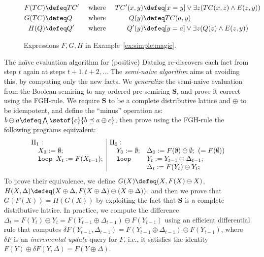 \begin{figure}
\footnotesize
  \begin{alignat*}{3}
    F(TC) \defeq & TC' &&\mbox{ where } & TC'(x,y) \defeq &[x=y] \vee \exists z(TC(x,z) \wedge E(z,y)) \\
    G(TC) \defeq & Q   &&\mbox{ where } & Q(y) \defeq & TC(a,y) \\
    H(Q) \defeq & Q'   &&\mbox{ where } & Q'(y) \defeq & [y=a] \vee \exists z(Q(z) \wedge E(z,y))
  \end{alignat*}
\caption{Expressions $F,G,H$ in Example~\ref{ex:simple:magic}.}
  \label{fig:simple:magic}
\end{figure}

\begin{ex} The na\"ive evaluation
    algorithm for (positive) Datalog re-discovers each fact from step $t$ again at
    steps $t+1, t+2, \ldots$ The {\em semi-naive algorithm} aims at avoiding
  this, by computing only the new facts.  We {\em generalize} the semi-naive
  evaluation from the Boolean semiring to any ordered pre-semiring
  $\bm S$, and prove it correct using the FGH-rule.  We require
  $\bm S$ to be a complete distributive lattice and $\oplus$ to be
  idempotent, and define the ``minus'' operation as:
  $b \ominus a \defeq \bigwedge \setof{c}{b \preceq a \oplus c}$, then prove using
  the FGH-rule the following programs equivalent:
%
  \begin{align*}
    \begin{array}{ll|lll}
      \Pi_1: \hspace{-8mm} & & \Pi_2: \hspace{-8mm} && \\
      & X_0 := \emptyset;               && Y_0 := \emptyset;  & \Delta_0 := F(\emptyset)  \ominus \emptyset;\    (= F(\emptyset)) \\
      & \texttt{loop } X_t := F(X_{t-1}); && \texttt{loop } & Y_t := Y_{t-1} \oplus \Delta_{t-1};\\
      &                                 &&              & \Delta_t := F(Y_{t}) \ominus Y_{t};
    \end{array}
  \end{align*}
%
  To prove their equivalence, we define $G(X)\defeq (X, F(X)\ominus X)$,
  $H(X,\Delta) \defeq (X \oplus \Delta, F(X\oplus \Delta )\ominus (X\oplus \Delta))$, and then we prove
  that $G(F(X)) = H(G(X))$ by exploiting the fact that $\bm S$ is a
  complete distributive lattice. In practice, we compute the
  difference $\Delta_t = F(Y_{t})\ominus Y_{t} =
  F(Y_{t-1}\oplus \Delta_{t-1}) \ominus F(Y_{t-1})$
  using an efficient differential rule
  that computes
  $\delta F(Y_{t-1}, \Delta_{t-1}) =
  F(Y_{t-1}\oplus \Delta_{t-1}) \ominus F(Y_{t-1})$, where $\delta F$ is
  an {\em incremental update} query for $F$, i.e., it satisfies the
  identity $F(Y) \oplus \delta F(Y, \Delta) = F(Y\oplus \Delta)$.


\end{ex}
